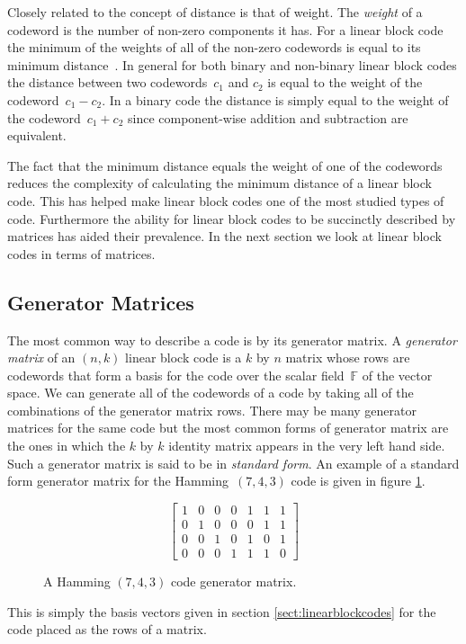 Closely related to the concept of distance is that of weight.
The \emph{weight} of a codeword is the number of non-zero components it has.
For a linear block code the minimum of the weights of all of the non-zero codewords is equal to its minimum distance~\cite[p.~8]{huf03}.
In general for both binary and non-binary linear block codes the distance between two codewords~$c_1$ and $c_2$ is equal to the weight of the codeword~$c_1 - c_2$.
In a binary code the distance is simply equal to the weight of the codeword~$c_1 + c_2$ since component-wise addition and subtraction are equivalent.

The fact that the minimum distance equals the weight of one of the codewords reduces the complexity of calculating the minimum distance of a linear block code.
This has helped make linear block codes one of the most studied types of code.
Furthermore the ability for linear block codes to be succinctly described by matrices has aided their prevalence.
In the next section we look at linear block codes in terms of matrices.

\subsection{Generator Matrices}
\label{sect:generatormatrices}
The most common way to describe a code is by its generator matrix.
A \emph{generator matrix} of an $(n,k)$ linear block code is a $k$ by $n$ matrix whose rows are codewords that form a basis for the code over the scalar field~$\mathbb{F}$ of the vector space.
We can generate all of the codewords of a code by taking all of the combinations of the generator matrix rows.
There may be many generator matrices for the same code but the most common forms of generator matrix are the ones in which the $k$ by $k$ identity matrix appears in the very left hand side.
Such a generator matrix is said to be in \emph{standard form}.
An example of a standard form generator matrix for the Hamming~$(7,4,3)$ code is given in figure \ref{fig:standardhamming}.
\begin{figure}[htbp]
\begin{center}
\[ \left[ \begin{array}{ccccccc}
1 & 0 & 0 & 0 & 1 & 1 & 1 \\
0 & 1 & 0 & 0 & 0 & 1 & 1 \\
0 & 0 & 1 & 0 & 1 & 0 & 1 \\
0 & 0 & 0 & 1 & 1 & 1 & 0
\end{array} \right] \]
\caption{A Hamming $(7,4,3)$ code generator matrix.}
\label{fig:standardhamming}
\end{center}
\end{figure}
This is simply the basis vectors given in section \ref{sect:linearblockcodes} for the code placed as the rows of a matrix.

